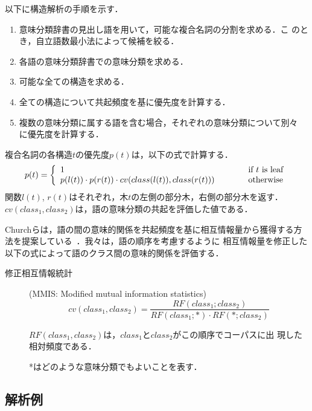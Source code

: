 以下に構造解析の手順を示す．
\begin{enumerate}
\item 意味分類辞書の見出し語を用いて，可能な複合名詞の分割を求める．こ
のとき，自立語数最小法によって候補を絞る．
\item 各語の意味分類辞書での意味分類を求める．
\item 可能な全ての構造を求める．
\item 全ての構造について共起頻度を基に優先度を計算する．
\item 複数の意味分類に属する語を含む場合，それぞれの意味分類について別々
に優先度を計算する．
\end{enumerate}

複合名詞の各構造$t$の優先度$p(t)$は，以下の式で計算する．
\begin{displaymath}
  p(t) = \left\{
  \begin{array}{l@{\qquad\qquad}l}
    1 & \mbox{if $t$ is leaf} \\
    p(l(t))\cdot p(r(t))\cdot cv(class(l(t)),class(r(t)))
      & \mbox{otherwise}\\
  \end{array} \right.
\end{displaymath}
関数$l(t)$, $r(t)$はそれぞれ，木$t$の左側の部分木，右側の部分木を返す．
$cv(class_1,class_2)$は，語の意味分類の共起を評価した値である．

Churchらは，語の間の意味的関係を共起頻度を基に相互情報量から獲得する方
法を提案している~\cite{church:91:a}．我々は，語の順序を考慮するように
相互情報量を修正した以下の式によって語のクラス間の意味的関係を評価する．

\begin{description}
\item[修正相互情報統計] (MMIS: 
  Modified mutual information statistics)
  $$cv(class_1,class_2) = \frac{RF(class_1;class_2)}{RF(class_1;*)\cdot RF(*;class_2)}$$

  $RF(class_1,class_2)$は，$class_1$と$class_2$がこの順序でコーパスに出
現した相対頻度である．

*はどのような意味分類でもよいことを表す．
\end{description}

\begin{center}
\end{center}

\subsection*{解析例}

